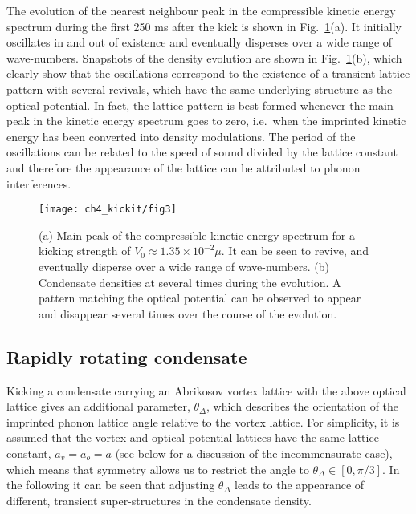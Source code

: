 The evolution of the nearest neighbour peak in the compressible kinetic energy spectrum during the first 250 ms after the kick is shown in Fig.~\ref{fig:novtx_p5k}(a). It initially oscillates in and out of existence and eventually disperses over a wide range of wave-numbers. Snapshots of the density evolution are shown in Fig.~\ref{fig:novtx_p5k}(b), which clearly show that the oscillations correspond to the existence of a transient lattice pattern with several revivals, which have the same underlying structure as the optical potential. In fact, the lattice pattern is best formed whenever the main peak in the kinetic energy spectrum goes to zero, i.e.~when the imprinted kinetic energy has been converted into density modulations. The period of the oscillations can be related to the speed of sound divided by the lattice constant and therefore the appearance of the lattice can be attributed to phonon interferences.


\begin{figure}[tb]
	\texttt{[image: ch4\_kickit/fig3]}
	\caption{(a) Main peak of the compressible kinetic energy spectrum for a kicking strength of $V_0 \approx 1.35\times10^{-2}\mu$. It can be seen to revive, and eventually disperse over a wide range of wave-numbers.  (b) Condensate densities at several times during the evolution. A pattern matching the optical potential can be observed to appear and disappear several times over the course of the evolution.}
	\label{fig:novtx_p5k}
\end{figure}


\subsection{Rapidly rotating condensate}

    Kicking a condensate carrying an Abrikosov vortex lattice with the above optical lattice gives an additional parameter, $\theta_\Delta$, which describes the orientation of the imprinted phonon lattice angle relative to the vortex lattice. For simplicity, it is assumed that the vortex and optical potential lattices have the same lattice constant, $a_v=a_o=a$ (see below for a discussion of the incommensurate case), which means that symmetry allows us to restrict the angle to $\theta_\Delta\in[0,\pi/3]$. In the following it can be seen that adjusting $\theta_\Delta$ leads to the appearance of different, transient super-structures in the condensate density.

